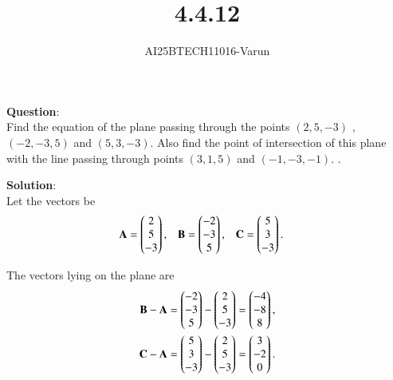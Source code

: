 \documentclass[journal]{IEEEtran}
\begin{document}

\vspace{3cm}

\title{4.4.12}
\author{AI25BTECH11016-Varun}
 \maketitle
{\let\newpage\relax\maketitle}
\renewcommand{\thefigure}{\theenumi}
\renewcommand{\thetable}{\theenumi}
\setlength{\intextsep}{10pt} %

\renewcommand{\thetable}{\theenumi}
\textbf{Question}:\\

Find the equation of the plane passing through the points $(2, 5, -3)$ , $(-2, -3, 5)$ and
$(5, 3, -3)$. Also find the point of intersection of this plane with the line passing
through points $(3, 1, 5)$ and $(-1, -3, -1)$.
.
  
\textbf{Solution}:\\
Let the vectors be
\begin{align}
\mathbf{A} &= \begin{pmatrix}2 \\ 5 \\ -3\end{pmatrix}, &
\mathbf{B} &= \begin{pmatrix}-2 \\ -3\\ 5\end{pmatrix}, &
\mathbf{C} &= \begin{pmatrix}5 \\ 3 \\ -3\end{pmatrix}.
\end{align}

The vectors lying on the plane are
\begin{align}
\mathbf{B} - \mathbf{A} = \begin{pmatrix}-2 \\ -3 \\ 5\end{pmatrix} - \begin{pmatrix}2 \\ 5 \\ -3\end{pmatrix} 
= \begin{pmatrix}-4 \\ -8 \\ 8\end{pmatrix}, \\
\mathbf{C} - \mathbf{A} = \begin{pmatrix}5 \\ 3 \\ -3\end{pmatrix} - \begin{pmatrix}2 \\ 5 \\ -3\end{pmatrix} 
= \begin{pmatrix}3 \\ -2 \\ 0\end{pmatrix}.
\end{align}
\end{document}

